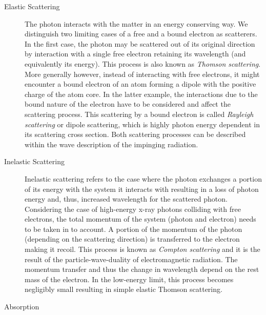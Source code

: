 \begin{description}
       \item[Elastic Scattering]
          {The photon interacts with the matter in an energy conserving way. We distinguish two limiting cases of a free and a bound electron as scatterers. In the first case, the photon may be scattered out of its original direction by interaction with a single free electron retaining its wavelength (and equivalently its energy). This process is also known as \emph{Thomson scattering}. More generally however, instead of interacting with free electrons, it might encounter a bound electron of an atom forming a dipole with the positive charge of the atom core. In the latter example, the interactions due to the bound nature of the electron have to be considered and affect the scattering process. This scattering by a bound electron is called \emph{Rayleigh scattering} or dipole scattering, which is highly photon energy dependent in its scattering cross section. Both scattering processes can be described within the wave description of the impinging radiation.}
       \item[Inelastic Scattering]
          {Inelastic scattering refers to the case where the photon exchanges a portion of its energy with the system it interacts with resulting in a loss of photon energy and, thus, increased wavelength for the scattered photon. Considering the case of high-energy x-ray photons colliding with free electrons, the total momentum of the system (photon and electron) needs to be taken in to account. A portion of the momentum of the photon (depending on the scattering direction) is transferred to the electron making it recoil. This process is known as \emph{Compton scattering} and it is the result of the particle-wave-duality of electromagnetic radiation. The momentum transfer and thus the change in wavelength depend on the rest mass of the electron. In the low-energy limit, this process becomes negligibly small resulting in simple elastic Thomson scattering.}      %
       \item[Absorption]

\end{description}
